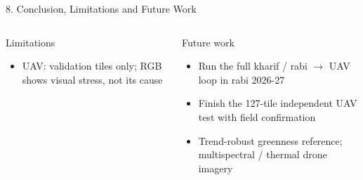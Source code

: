 \documentclass[aspectratio=169,10pt]{beamer}
\begin{document}
\begin{frame}{8. Conclusion, Limitations and Future Work}
\begin{columns}[T,onlytextwidth]
\begin{warncard}[equal height group=conc2]{Limitations}
\begin{itemize}
\item UAV: validation tiles only; RGB shows visual stress, not its cause
\end{itemize}
\end{warncard}
\begin{card}[equal height group=conc2]{Future work}
\scriptsize
\begin{itemize}
\item Run the full kharif / rabi $\rightarrow$ UAV loop in rabi 2026-27
\item Finish the 127-tile independent UAV test with field confirmation
\item Trend-robust greenness reference; multispectral / thermal drone imagery
\end{itemize}
\end{card}
\end{columns}
\end{frame}
\end{document}

